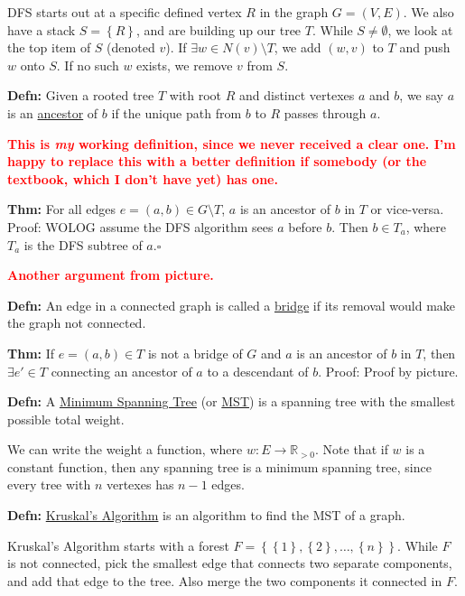 \documentclass[10pt,letterpaper]{article}
\newcommand{\n}{\hfill\break}
\newcommand{\defn}[1]{\par\noindent\settowidth{\hangindent}{\textbf{Defn: }}\textbf{Defn: }#1\n}
\newcommand{\thm}[1]{\par\noindent\settowidth{\hangindent}{\textbf{Thm: }}\textbf{Thm: }#1\n}
\newcommand{\proven}{\;$\square$\n}
\newcommand{\set}[1]{\left\{#1\right\}}
\newcommand{\reals}{\mathbb{R}}
\newcommand{\R}{\reals}
\newcommand{\flag}[1]{\textbf{\textcolor{red}{#1}}}
\begin{document}
\par\noindent DFS starts out at a specific defined vertex $R$ in the graph $G=(V,E)$. We also have a stack $S=\set{R}$, and are building up our tree $T$. While $S\ne\emptyset$, we look at the top item of $S$ (denoted $v$). If $\exists{}w\in{}N(v)\setminus{}T$, we add $(w,v)$ to $T$ and push $w$ onto $S$. If no such $w$ exists, we remove $v$ from $S$.\n

\defn{Given a rooted tree $T$ with root $R$ and distinct vertexes $a$ and $b$, we say $a$ is an \underline{ancestor} of $b$ if the unique path from $b$ to $R$ passes through $a$.}

\par\noindent\flag{This is \textit{my} working definition, since we never received a clear one. I'm happy to replace this with a better definition if somebody (or the textbook, which I don't have yet) has one.}\n

\thm{For all edges $e=(a,b)\in{}G\setminus{}T$, $a$ is an ancestor of $b$ in $T$ or vice-versa.\n
Proof: WOLOG assume the DFS algorithm sees $a$ before $b$. Then $b\in{}T_{a}$, where $T_{a}$ is the DFS subtree of $a$.\proven}

\par\noindent\flag{Another argument from picture.}\n

\defn{An edge in a connected graph is called a \underline{bridge} if its removal would make the graph not connected.}

\thm{If $e=(a,b)\in{}T$ is not a bridge of $G$ and $a$ is an ancestor of $b$ in $T$, then $\exists{}e'\in{}T$ connecting an ancestor of $a$ to a descendant of $b$.\n
Proof: Proof by picture.}

\defn{A \underline{Minimum Spanning Tree} (or \underline{MST}) is a spanning tree with the smallest possible total weight.}

\par\noindent We can write the weight a function, where $w:E\to\R_{>0}$. Note that if $w$ is a constant function, then any spanning tree is a minimum spanning tree, since every tree with $n$ vertexes has $n-1$ edges.\n

\defn{\underline{Kruskal's Algorithm} is an algorithm to find the MST of a graph.}

\par\noindent Kruskal's Algorithm starts with a forest $F=\set{\set{1},\set{2},\ldots,\set{n}}$. While $F$ is not connected, pick the smallest edge that connects two separate components, and add that edge to the tree. Also merge the two components it connected in $F$.\n
\end{document}
